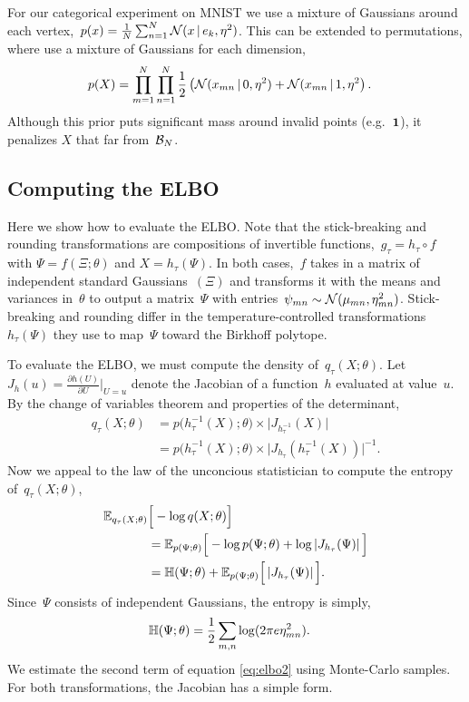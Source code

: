 \documentclass[twoside]{article}
\begin{document}
For our categorical experiment on MNIST we use a mixture of Gaussians
around each
vertex,~${p(x) = \tfrac{1}{N} \sum_{n=1}^N \mathcal{N}(x \, | \, e_k,
  \eta^2)}$.  This can be extended to permutations, where use a
mixture of Gaussians for each dimension,
\begin{align}
\label{eq:permprior}
  p(X) &= \prod_{m=1}^N \prod_{n=1}^N
  \frac{1}{2} \left(\mathcal{N}(x_{mn} \, | \, 0, \eta^2) + \mathcal{N}(x_{mn} \, | \, 1, \eta^2 \right).
\end{align}
Although this prior puts significant mass around invalid points
(e.g.~$\boldsymbol{1}$), it penalizes $X$ that far from~$\mathcal{B}_N$.

\subsection{Computing the ELBO}
Here we show how to evaluate the ELBO.  Note that the stick-breaking
and rounding transformations are compositions of invertible
functions,~${g_\tau = h_\tau \circ f}$ with ${\Psi = f(\Xi; \theta)}$ and
${X = h_\tau(\Psi)}$.  In both cases,~$f$ takes in a matrix of
independent standard Gaussians~$(\Xi)$ and transforms it with the
means and variances in~$\theta$ to output a matrix~$\Psi$ with
entries~${\psi_{mn} \sim \mathcal{N}(\mu_{mn}, \eta^2_{mn})}$.
Stick-breaking and rounding differ in the temperature-controlled
transformations~$h_\tau(\Psi)$ they use to map~$\Psi$ toward the
Birkhoff polytope.

To evaluate the ELBO, we must compute the density
of~$q_\tau(X; \theta)$.
Let~${J_h(u) = \frac{\partial h(U)}{\partial U} \big|_{U=u}}$ denote
the Jacobian of a function~$h$ evaluated at value~$u$. By the change
of variables theorem and properties of the determinant,
\begin{align*}
  q_\tau(X; \theta)
  &= p \big(h_\tau^{-1}(X) ;\theta \big)
    \times \big| J_{h_\tau^{-1}}(X) \big|
  \\
  &= p \big(h_\tau^{-1}(X); \theta \big)
    \times \big| J_{h_\tau}(h_\tau^{-1}(X)) \big|^{-1}.
\end{align*}
Now we appeal to the law of the unconcious statistician to compute
the entropy of~$q_\tau(X; \theta)$,
\begin{align}
  \label{eq:elbo2}
  \nonumber \mathbb{E}_{q_\tau(X; \theta)} & \Big[- \log q(X; \theta) \Big] \\
  \nonumber &= \mathbb{E}_{p(\Psi;\theta)}
              \Big[ - \log p(\Psi;\theta) +
              \log \left| J_{h_\tau}(\Psi) \right| \Big] \\
  &= \mathbb{H}(\Psi; \theta)  +
  \mathbb{E}_{p(\Psi;\theta)} \Big[ \left| J_{h_\tau}(\Psi) \right| \Big].
\end{align}
Since~$\Psi$ consists of independent Gaussians, the entropy is simply,
\begin{align*}
  \mathbb{H}(\Psi; \theta) &=  \frac{1}{2} \sum_{m,n} \log(2 \pi e \eta_{mn}^2).
\end{align*}
We estimate the second term of equation \eqref{eq:elbo2} using
Monte-Carlo samples. For both transformations, the Jacobian has a
simple form.
\end{document}
